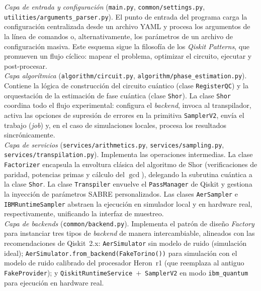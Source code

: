 \documentclass[12pt, spanish]{book}
\begin{document}
\vspace{0.5cm}

\textit{Capa de entrada y configuración} (\texttt{main.py}, \texttt{common/settings.py}, \texttt{utiliti\-es/arguments\_parser.py}). El punto de entrada del programa carga la configuración centralizada desde un archivo YAML y procesa los argumentos de la línea de comandos o, alternativamente, los parámetros de un archivo  de configuración masiva. Este esquema sigue la filosofía de los \textit{Qiskit Patterns}, que promueven un flujo cíclico: mapear el problema, optimizar el circuito, ejecutar y post-procesar.\\

\textit{Capa algorítmica} (\texttt{algorithm/circuit.py}, \texttt{algorithm/phase\_estimati\-on.py}). Contiene la lógica de construcción del circuito cuántico (clase \texttt{RegisterQC}) y la orquestación de la estimación de fase cuántica (clase \texttt{Shor}). La clase \texttt{Shor} coordina todo el flujo experimental: configura el \textit{backend}, invoca al transpilador, activa las opciones de supresión de errores en la primitiva \texttt{SamplerV2}, envía el trabajo (\textit{job}) y, en el caso de simulaciones locales, procesa los resultados sincrónicamente.\\

\textit{Capa de servicios} (\texttt{services/arithmetics.py}, \texttt{services/sampling.py}, \texttt{services/transpilation.py}). Implementa las operaciones intermedias. La clase \texttt{Factorizer} encapsula la envoltura clásica del algoritmo de Shor (verificaciones de paridad, potencias primas y cálculo del $\gcd$), delegando la subrutina cuántica a la clase \texttt{Shor}. La clase \texttt{Transpiler} envuelve el \texttt{PassManager} de Qiskit y gestiona la inyección de parámetros SABRE personalizados. Las clases \texttt{AerSampler} e \texttt{IBMRuntimeSampler} abstraen la ejecución en simulador local y en hardware real, respectivamente, unificando la interfaz de muestreo.\\

\textit{Capa de \textit{backends}} (\texttt{common/backend.py}). Implementa el patrón de diseño \textit{Factory} para instanciar tres tipos de \textit{backend} de manera intercambiable, alineados con las recomendaciones de Qiskit~2.x: \texttt{AerSimulator} sin modelo de ruido (simulación ideal); \texttt{AerSimulator.from\_backend(FakeTorino())} para simulación con el modelo de ruido calibrado del procesador Heron~r1 (que reemplaza al antiguo \texttt{FakeProvider}); y \texttt{QiskitRuntimeService}~$+$~\texttt{SamplerV2} en modo \texttt{ibm\_quantum} para ejecución en hardware real.\\
\end{document}
